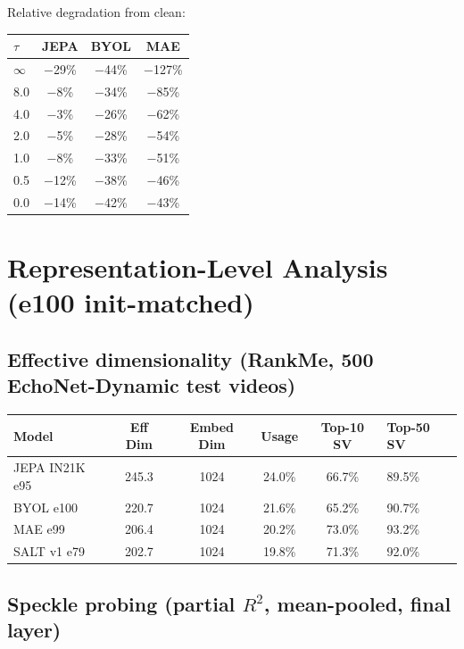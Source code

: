\documentclass{article}
\begin{document}
Relative degradation from clean:

\begin{center}
\begin{tabular}{lccc}
\toprule
$\tau$ & JEPA & BYOL & MAE \\
\midrule
$\infty$ & $-$29\% & $-$44\% & $-$127\% \\
8.0      & $-$8\%  & $-$34\% & $-$85\% \\
4.0      & $-$3\%  & $-$26\% & $-$62\% \\
2.0      & $-$5\%  & $-$28\% & $-$54\% \\
1.0      & $-$8\%  & $-$33\% & $-$51\% \\
0.5      & $-$12\% & $-$38\% & $-$46\% \\
0.0      & $-$14\% & $-$42\% & $-$43\% \\
\bottomrule
\end{tabular}
\end{center}

\section{Representation-Level Analysis (e100 init-matched)}

\subsection{Effective dimensionality (RankMe, 500 EchoNet-Dynamic test videos)}

\begin{center}
\begin{tabular}{lcccc}
\toprule
Model & Eff Dim & Embed Dim & Usage & Top-10 SV & Top-50 SV \\
\midrule
JEPA IN21K e95 & 245.3 & 1024 & 24.0\% & 66.7\% & 89.5\% \\
BYOL e100      & 220.7 & 1024 & 21.6\% & 65.2\% & 90.7\% \\
MAE e99        & 206.4 & 1024 & 20.2\% & 73.0\% & 93.2\% \\
SALT v1 e79    & 202.7 & 1024 & 19.8\% & 71.3\% & 92.0\% \\
\bottomrule
\end{tabular}
\end{center}

\subsection{Speckle probing (partial $R^2$, mean-pooled, final layer)}
\end{document}
